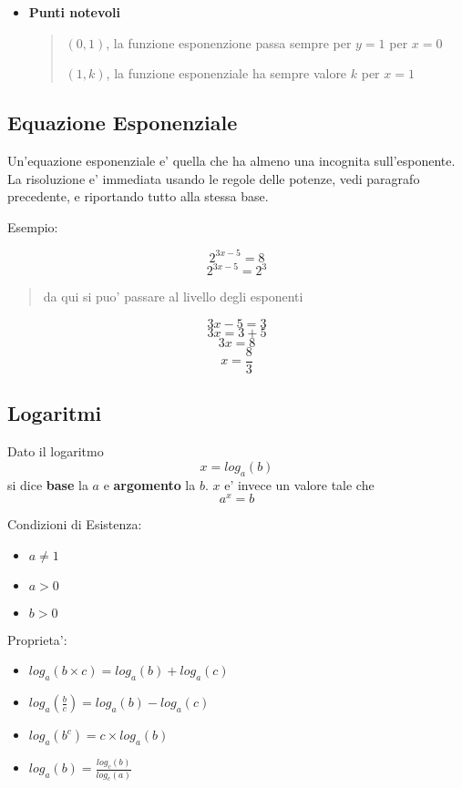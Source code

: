 \documentclass{article}
\begin{document}
{\begin{itemize}
\begin{quote}
      $ 0 < k < 1 $, la funzione presenta un'asintoto sull'asse $ x $ per $ x $ che tende a $ +\infty $, vedi curva blu
    \end{quote}
    \item \textbf{Punti notevoli}
    \begin{quote}
      $ (0,1) $, la funzione esponenzione passa sempre per $ y = 1 $ per $ x = 0 $

      $ (1,k) $, la funzione esponenziale ha sempre valore $ k $ per $ x = 1 $
    \end{quote}
  \end{itemize}

  \pagebreak

  \subsection{Equazione Esponenziale}
  Un'equazione esponenziale e' quella che ha almeno una incognita sull'esponente. La risoluzione e' immediata usando le regole delle potenze, vedi paragrafo precedente, e riportando tutto alla stessa base.

  Esempio:

  $$ 2^{3x - 5} = 8 $$
  $$ 2^{3x - 5} = 2^3 $$

  \begin{quote}
    da qui si puo' passare al livello degli esponenti
  \end{quote}

  $$ 3x - 5 = 3 $$
  $$ 3x = 3 + 5 $$
  $$ 3x = 8 $$
  $$ x = \frac{8}{3} $$

  \subsection{Logaritmi}
  Dato il logaritmo
  $$ x = log_a(b) $$
  si dice \textbf{base} la $ a $ e \textbf{argomento} la $ b $. $ x $ e' invece un valore tale che
  $$ a^x = b $$

  Condizioni di Esistenza:
  \begin{itemize}
    \item $ a \neq 1 $
    \item $ a > 0 $
    \item $ b > 0 $
  \end{itemize}

  Proprieta':
  \begin{itemize}
    \item $ log_a(b \times c) = log_a(b) + log_a(c) $
    \item $ log_a(\frac{b}{c}) = log_a(b) - log_a(c) $
    \item $ log_a(b^c) = c \times log_a(b) $
    \item $ log_a(b) = \frac{log_c(b)}{log_c(a)} $
  \end{itemize}

}
\end{document}
